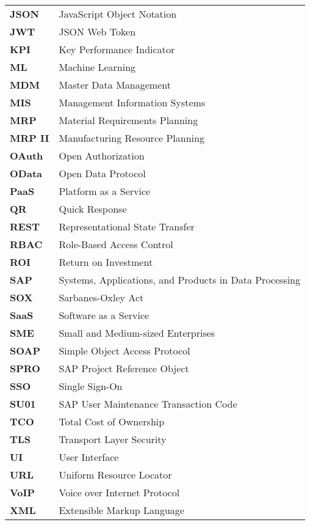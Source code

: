 \begin{longtable}{ll}
    \textbf{JSON} & JavaScript Object Notation \\
    \textbf{JWT} & JSON Web Token \\
    \textbf{KPI} & Key Performance Indicator \\
    \textbf{ML} & Machine Learning \\
    \textbf{MDM} & Master Data Management \\
    \textbf{MIS} & Management Information Systems \\
    \textbf{MRP} & Material Requirements Planning \\
    \textbf{MRP II} & Manufacturing Resource Planning \\
    \textbf{OAuth} & Open Authorization \\
    \textbf{OData} & Open Data Protocol \\
    \textbf{PaaS} & Platform as a Service \\
    \textbf{QR} & Quick Response \\
    \textbf{REST} & Representational State Transfer \\
    \textbf{RBAC} & Role-Based Access Control \\
    \textbf{ROI} & Return on Investment \\
    \textbf{SAP} & Systems, Applications, and Products in Data Processing \\
    \textbf{SOX} & Sarbanes-Oxley Act \\
    \textbf{SaaS} & Software as a Service \\
    \textbf{SME} & Small and Medium-sized Enterprises \\
    \textbf{SOAP} & Simple Object Access Protocol \\
    \textbf{SPRO} & SAP Project Reference Object \\
    \textbf{SSO} & Single Sign-On \\
    \textbf{SU01} & SAP User Maintenance Transaction Code \\
    \textbf{TCO} & Total Cost of Ownership \\
    \textbf{TLS} & Transport Layer Security \\
    \textbf{UI} & User Interface \\
    \textbf{URL} & Uniform Resource Locator \\
    \textbf{VoIP} & Voice over Internet Protocol \\
    \textbf{XML} & Extensible Markup Language \\
\end{longtable}

